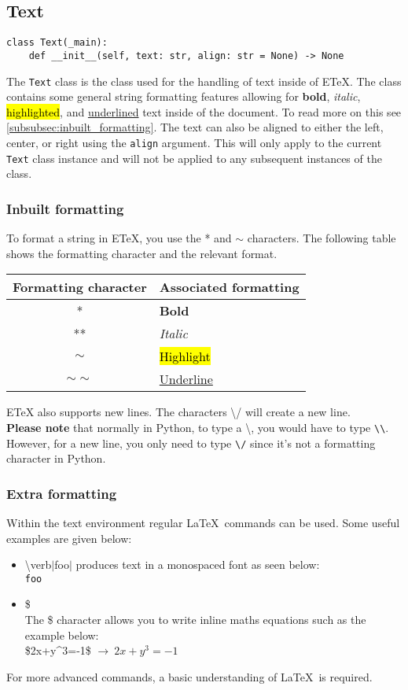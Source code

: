 \documentclass{article}
\begin{document}
\subsection{Text}\label{subsec:text}
\begin{verbatim}
class Text(_main):
	def __init__(self, text: str, align: str = None) -> None
\end{verbatim}
The \verb|Text| class is the class used for the handling of text inside of ETeX. The class contains some general string formatting features allowing for \textbf{bold}, \textit{italic}, \hl{highlighted}, and \underline{underlined} text inside of the document. To read more on this see \autoref{subsubsec:inbuilt_formatting}. The text can also be aligned to either the left, center, or right using the \verb|align| argument. This will only apply to the current \verb|Text| class instance and will not be applied to any subsequent instances of the class.
\subsubsection{Inbuilt formatting}\label{subsubsec:inbuilt_formatting}
To format a string in ETeX, you use the * and $\sim$ characters. The following table shows the formatting character and the relevant format.\\

\begin{center}
\begin{tabular}{| c | l |}
\hline
Formatting character & Associated formatting \\ \hline
* & \textbf{Bold} \\
** & \textit{Italic} \\
$\sim$ & \hl{Highlight} \\
$\sim\sim$ & \underline{Underline} \\
\hline
\end{tabular}
\end{center}
ETeX also supports new lines. The characters \textbackslash/ will create a new line.\\
 \textbf{Please note} that normally in Python, to type a \textbackslash, you would have to type \verb|\\|. However, for a new line, you only need to type \verb|\|\verb|/| since it's not a formatting character in Python.
\subsubsection{Extra formatting}\label{subsubsec:extra_formatting}
Within the text environment regular \LaTeX\ commands can be used. Some useful examples are given below:\begin{itemize}
\item {\textbackslash}verb$\mid${foo}$\mid$ produces text in a monospaced font as seen below:\\
\verb|foo|
\item \$\\The \$ character allows you to write inline maths equations such as the example below:\\
\$2x+y\^{}3=-1\$ $\rightarrow\ 2x+y^3=-1$
\end{itemize}
For more advanced commands, a basic understanding of \LaTeX\ is required.
\end{document}
